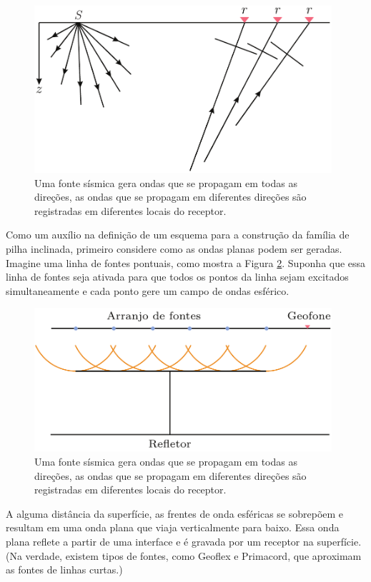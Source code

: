 \begin{figure}[H]
\centering
\includegraphics[width=11cm]{figuras/cap2/radon1.pdf}
\caption{Uma fonte sísmica gera ondas que se propagam em todas as direções, as ondas que se propagam em diferentes direções são registradas em diferentes locais do receptor.}
\label{fig:radon1}
\end{figure}

Como um auxílio na definição de um esquema para a construção da família de pilha inclinada, primeiro considere como as ondas planas podem ser geradas. Imagine uma linha de fontes pontuais, como mostra a Figura \ref{fig:radon2}. Suponha que essa linha de fontes seja ativada para que todos os pontos da linha sejam excitados simultaneamente e cada ponto gere um campo de ondas esférico.

\begin{figure}[H]
\centering
\includegraphics[width=11cm]{figuras/cap2/radon2.pdf}
\caption{Uma fonte sísmica gera ondas que se propagam em todas as direções, as ondas que se propagam em diferentes direções são registradas em diferentes locais do receptor.}
\label{fig:radon2}
\end{figure}

A alguma distância da superfície, as frentes de onda esféricas se sobrepõem e resultam em uma onda plana que viaja verticalmente para baixo. Essa onda plana reflete a partir de uma interface e é gravada por um receptor na superfície. (Na verdade, existem tipos de fontes, como Geoflex e Primacord, que aproximam as fontes de linhas curtas.)

